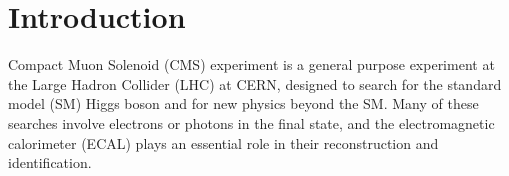 \documentclass[journal]{IEEEtran}
\begin{document}
%
\IEEEpeerreviewmaketitle



\section{Introduction}
 Compact Muon Solenoid (CMS) experiment \cite{Chatrchyan:2008aa} is a general purpose experiment at the Large Hadron Collider (LHC) at CERN, designed to search for the standard model (SM) Higgs boson and for new physics beyond the SM. Many of these searches involve electrons or photons in the final state, and the electromagnetic calorimeter (ECAL) plays an essential role in their reconstruction and identification.
\end{document}
